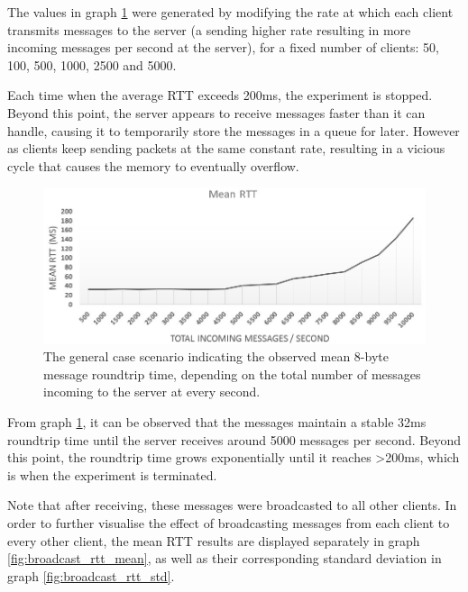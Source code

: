 \documentclass[bsc,frontabs,twoside,singlespacing,parskip,deptreport]{infthesis}     %
\begin{document}
The values in graph \ref{fig:mean_rtt} were generated by modifying the rate at which each client transmits messages to the server (a sending higher rate resulting in more incoming messages per second at the server), for a fixed number of clients: 50, 100, 500, 1000, 2500 and 5000.

Each time when the average RTT exceeds 200ms, the experiment is stopped. Beyond this point, the server appears to receive messages faster than it can handle, causing it to temporarily store the messages in a queue for later. However as clients keep sending packets at the same constant rate, resulting in a vicious cycle that causes the memory to eventually overflow.

\begin{figure}[H]
\centering
\includegraphics[scale=0.46]{images/mean_rtt.jpg}
\caption{The general case scenario indicating the observed mean 8-byte message roundtrip time, depending on the total number of messages incoming to the server at every second.}
\label{fig:mean_rtt}
\end{figure}

From graph \ref{fig:mean_rtt}, it can be observed that the messages maintain a stable 32ms roundtrip time until the server receives around 5000 messages per second. Beyond this point, the roundtrip time grows exponentially until it reaches >200ms, which is when the experiment is terminated.

Note that after receiving, these messages were broadcasted to all other clients. In order to further visualise the effect of broadcasting messages from each client to every other client, the mean RTT results are displayed separately in graph \ref{fig:broadcast_rtt_mean}, as well as their corresponding standard deviation in graph \ref{fig:broadcast_rtt_std}.
\end{document}
